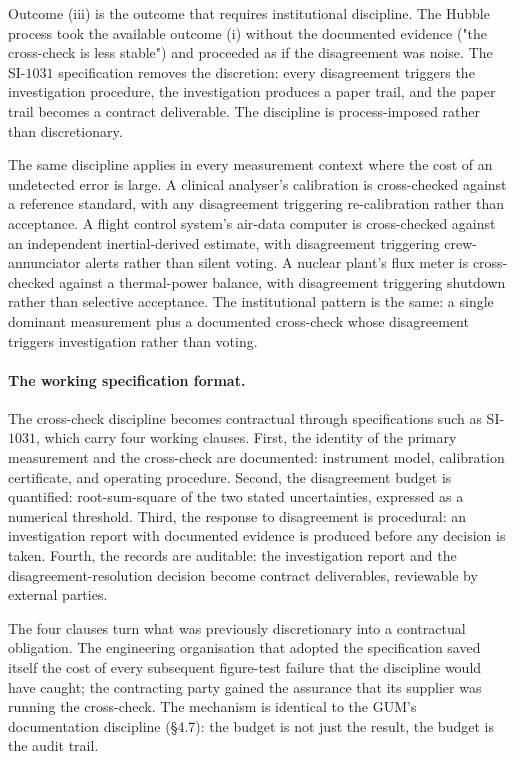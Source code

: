 Outcome (iii) is the outcome that requires institutional
discipline. The Hubble process took the available outcome (i)
without the documented evidence ("the cross-check is less
stable") and proceeded as if the disagreement was noise. The
SI-$1031$ specification removes the discretion: every
disagreement triggers the investigation procedure, the
investigation produces a paper trail, and the paper trail
becomes a contract deliverable. The discipline is
process-imposed rather than discretionary.

The same discipline applies in every measurement context
where the cost of an undetected error is large. A clinical
analyser's calibration is cross-checked against a reference
standard, with any disagreement triggering re-calibration
rather than acceptance. A flight control system's air-data
computer is cross-checked against an independent
inertial-derived estimate, with disagreement triggering
crew-annunciator alerts rather than silent voting. A nuclear
plant's flux meter is cross-checked against a thermal-power
balance, with disagreement triggering shutdown rather than
selective acceptance. The institutional pattern is the same:
a single dominant measurement plus a documented cross-check
whose disagreement triggers investigation rather than voting.

\paragraph{The working specification format.} The cross-check
discipline becomes contractual through specifications such as
SI-$1031$, which carry four working clauses. First, the
identity of the primary measurement and the cross-check are
documented: instrument model, calibration certificate, and
operating procedure. Second, the disagreement budget is
quantified: root-sum-square of the two stated uncertainties,
expressed as a numerical threshold. Third, the response to
disagreement is procedural: an investigation report with
documented evidence is produced before any decision is taken.
Fourth, the records are auditable: the investigation report
and the disagreement-resolution decision become contract
deliverables, reviewable by external parties.

The four clauses turn what was previously discretionary into
a contractual obligation. The engineering organisation that
adopted the specification saved itself the cost of every
subsequent figure-test failure that the discipline would have
caught; the contracting party gained the assurance that
its supplier was running the cross-check. The mechanism is
identical to the GUM's documentation discipline (\S 4.7): the
budget is not just the result, the budget is the audit trail.

